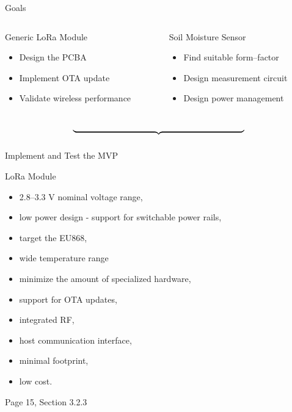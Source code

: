 \documentclass{beamer}
\begin{document}
\begin{frame}{Goals}
\begin{columns}[T]
\begin{column}{.5\textwidth}
    Generic LoRa Module
    \begin{itemize}
        \item Design the PCBA
        \item Implement OTA update
        \item Validate wireless performance
    \end{itemize}
\end{column}
\hfill
\begin{column}{.5\textwidth}
    Soil Moisture Sensor
    \begin{itemize}
        \item Find suitable form--factor
        \item Design measurement circuit
        \item Design power management
    \end{itemize}
\end{column}
\end{columns}
$$\underbrace{\text{\hspace{20em}}}_{}$$
\begin{center}
    Implement and Test the MVP
\end{center}
\end{frame}


\begin{frame}{LoRa Module}
\begin{itemize}
    \item 2.8--3.3 V nominal voltage range,
    \item low power design - support for switchable power rails,
    \item target the EU868,
    \item wide temperature range
    \item minimize the amount of specialized hardware,
    \item support for OTA updates,
    \item integrated RF,
    \item host communication interface,
    \item minimal footprint,
    \item low cost.
\end{itemize}
\begin{flushright}
    Page 15, Section 3.2.3
\end{flushright}
\end{frame}
\end{document}
